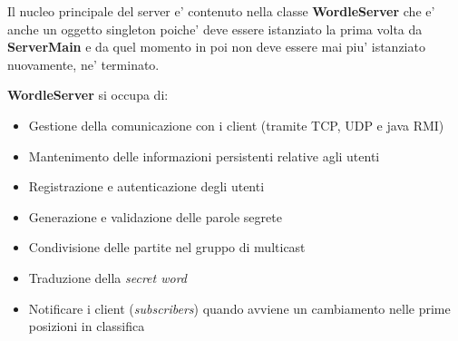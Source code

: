 \bigskip

Il nucleo principale del server e' contenuto nella classe \textbf{WordleServer} che e' anche un oggetto singleton poiche' deve essere istanziato la prima volta da \textbf{ServerMain} e da quel momento in poi non deve essere mai piu' istanziato nuovamente, ne' terminato.

\newpage

\textbf{WordleServer} si occupa di:
\begin{itemize}
	\item Gestione della comunicazione con i client (tramite TCP, UDP e java RMI)
	\item Mantenimento delle informazioni persistenti relative agli utenti
	\item Registrazione e autenticazione degli utenti
	\item Generazione e validazione delle parole segrete
	\item Condivisione delle partite nel gruppo di multicast
	\item Traduzione della \emph{secret word}
	\item Notificare i client (\emph{subscribers}) quando avviene un cambiamento nelle prime posizioni in classifica
\end{itemize}


